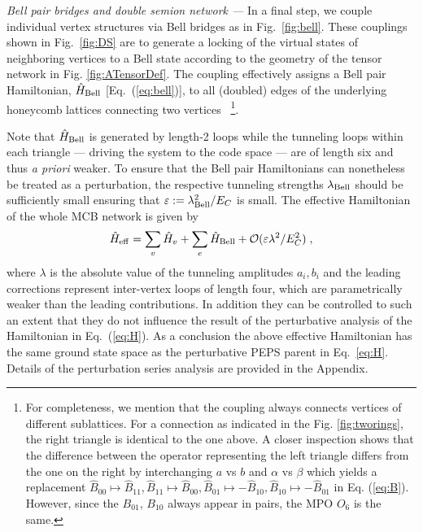 \documentclass[twocolumn,floats,prx,showpacs]{revtex4-1}
\begin{document}
\emph{Bell pair bridges and double semion network ---}
In a final step, we couple individual vertex structures  via Bell bridges as in Fig.~\ref{fig:bell}. These couplings shown in Fig.~\ref{fig:DS} are to generate a locking of the virtual states of neighboring vertices to a Bell state according to the geometry of the tensor network in Fig. \ref{fig:ATensorDef}. The coupling effectively assigns a Bell pair Hamiltonian, $\hat H_{\rm Bell}$ [Eq.~(\ref{eq:bell})], to all (doubled) edges of the underlying honeycomb lattices connecting two vertices
~\footnote{For completeness, we mention that the coupling always connects vertices of different sublattices. For a connection as indicated in the Fig. \ref{fig:tworings}, the right triangle is identical to the one above. A closer inspection shows that the difference between the operator representing the left triangle differs from the one on the right by interchanging $a$ vs $b$ and $\alpha$ vs $\beta$ which yields a replacement $\hat B_{00}\mapsto \hat B_{11}, \hat B_{11}\mapsto \hat B_{00}, \hat B_{01}\mapsto -\hat B_{10},\hat B_{10}\mapsto - \hat B_{01}$ in Eq. (\ref{eq:B}). However, since the $B_{01}$, $B_{10}$ always appear in pairs, the MPO $O_6$ is the same.}.



Note that $\hat H_{\rm Bell}$ is generated by length-2 loops while the  tunneling loops within each triangle --- driving the system to the code space --- 
are of length six and thus \emph{a priori} weaker. 
To ensure that the Bell pair Hamiltonians can nonetheless be treated as a perturbation, the respective tunneling strengths $\lambda_{\rm Bell}$ should be sufficiently small ensuring that $\varepsilon:=\lambda^2_{\rm Bell}/E_C$ is small. The effective Hamiltonian of the whole MCB network is given by
\begin{equation}
\hat H_{\rm eff}= \sum_v \hat H_v + \sum_e \hat H_{\rm Bell} + \mathcal O(\varepsilon\lambda^2/E_C^2) \;, \label{eq:DSeff}
\end{equation} 
where $\lambda$ is the absolute value of the tunneling amplitudes $a_i,b_i$ and the leading corrections represent inter-vertex loops of length four, which are parametrically weaker than the leading contributions. In addition they can be controlled to such an extent that they do not influence the result of the perturbative analysis \cite{Brell2014} of the Hamiltonian in Eq.~(\ref{eq:H}). As a conclusion the above effective Hamiltonian has the same ground state space as the perturbative PEPS parent in Eq.~\eqref{eq:H}. Details of the perturbation series analysis are provided in the Appendix.
\end{document}
